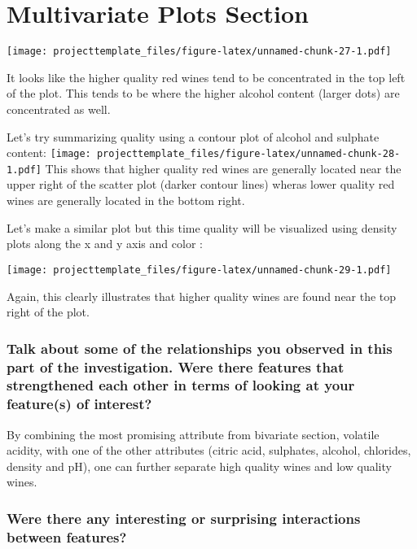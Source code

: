 \documentclass[]{article}
\begin{document}
\section{Multivariate Plots Section}\label{multivariate-plots-section}

\texttt{[image: projecttemplate\_files/figure-latex/unnamed-chunk-27-1.pdf]}

It looks like the higher quality red wines tend to be concentrated in
the top left of the plot. This tends to be where the higher alcohol
content (larger dots) are concentrated as well.

Let's try summarizing quality using a contour plot of alcohol and
sulphate content:
\texttt{[image: projecttemplate\_files/figure-latex/unnamed-chunk-28-1.pdf]}
This shows that higher quality red wines are generally located near the
upper right of the scatter plot (darker contour lines) wheras lower
quality red wines are generally located in the bottom right.

Let's make a similar plot but this time quality will be visualized using
density plots along the x and y axis and color :

\texttt{[image: projecttemplate\_files/figure-latex/unnamed-chunk-29-1.pdf]}

Again, this clearly illustrates that higher quality wines are found near
the top right of the plot.

\subsubsection{Talk about some of the relationships you observed in this
part of the investigation. Were there features that strengthened each
other in terms of looking at your feature(s) of
interest?}\label{talk-about-some-of-the-relationships-you-observed-in-this-part-of-the-investigation.-were-there-features-that-strengthened-each-other-in-terms-of-looking-at-your-features-of-interest}

By combining the most promising attribute from bivariate section,
volatile acidity, with one of the other attributes (citric acid,
sulphates, alcohol, chlorides, density and pH), one can further separate
high quality wines and low quality wines.

\subsubsection{Were there any interesting or surprising interactions
between
features?}\label{were-there-any-interesting-or-surprising-interactions-between-features}
\end{document}
